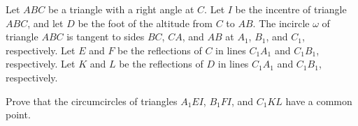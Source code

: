 Let $ABC$ be a triangle with a right angle at $C$. Let $I$ be the incentre of triangle $ABC$,  and let $D$ be the foot of the altitude from $C$ to $AB$. The incircle $\omega$ of triangle $ABC$ is tangent to sides $BC$,  $CA$,  and $AB$ at $A_1$,  $B_1$,  and $C_1$,  respectively. Let $E$ and $F$ be the reflections of $C$ in lines $C_1A_1$ and $C_1B_1$,  respectively. Let $K$ and $L$ be the reflections of $D$ in lines $C_1A_1$ and $C_1B_1$,  respectively.

Prove that the circumcircles of triangles $A_1EI$,  $B_1FI$,  and $C_1KL$ have a common point.